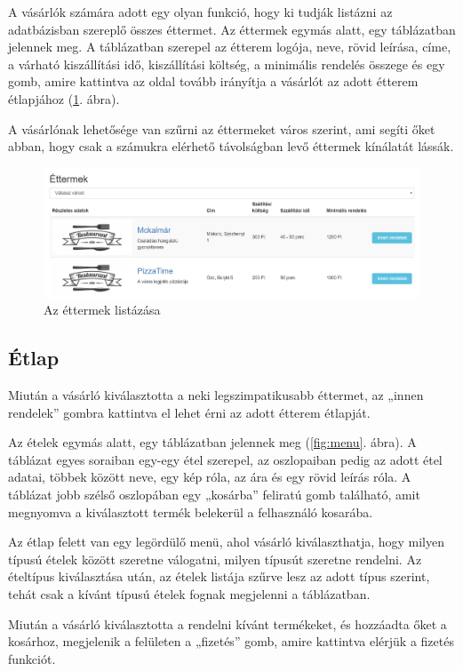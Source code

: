 A vásárlók számára adott egy olyan funkció, hogy ki tudják listázni az adatbázisban szereplő összes éttermet. Az éttermek egymás alatt, egy táblázatban jelennek meg. A táblázatban szerepel az étterem logója, neve, rövid leírása, címe, a várható kiszállítási idő, kiszállítási költség, a minimális rendelés összege és egy gomb, amire kattintva az oldal tovább irányítja a vásárlót az adott étterem étlapjához (\ref{fig:restaurants}. ábra).

A vásárlónak lehetősége van szűrni az éttermeket város szerint, ami segíti őket abban, hogy csak a számukra elérhető távolságban levő éttermek kínálatát lássák.

\begin{figure}
\centering
\includegraphics[scale=0.5]{kepek/restaurants.png}
\caption{Az éttermek listázása}
\label{fig:restaurants}
\end{figure}

\subsection{Étlap}

Miután a vásárló kiválasztotta a neki legszimpatikusabb éttermet, az „innen rendelek” gombra kattintva el lehet érni az adott étterem étlapját.

Az ételek egymás alatt, egy táblázatban jelennek meg (\ref{fig:menu}. ábra). A táblázat egyes soraiban egy-egy étel szerepel, az oszlopaiban pedig az adott étel adatai, többek között neve, egy kép róla, az ára és egy rövid leírás róla. A táblázat jobb szélső oszlopában egy „kosárba” feliratú gomb található, amit megnyomva a kiválasztott termék belekerül a felhasználó kosarába.

Az étlap felett van egy legördülő menü, ahol vásárló kiválaszthatja, hogy milyen típusú ételek között szeretne válogatni, milyen típusút szeretne rendelni. Az ételtípus kiválasztása után, az ételek listája szűrve lesz az adott típus szerint, tehát csak a kívánt típusú ételek fognak megjelenni a táblázatban.

Miután a vásárló kiválasztotta a rendelni kívánt termékeket, és hozzáadta őket a kosárhoz, megjelenik a felületen a „fizetés” gomb, amire kattintva elérjük a fizetés funkciót.

